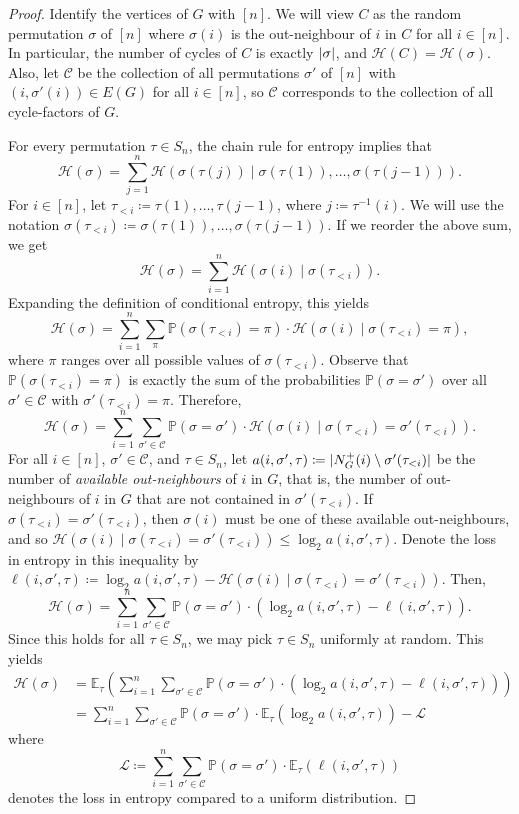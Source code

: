 \documentclass[10pt,a4paper]{amsart}
\newcommand{\pr}{\mathbb{P}}
\newcommand{\ev}{\mathbb{E}}
\newcommand{\ent}{\mathcal{H}}
\newcommand{\cL}{\mathcal L}
\newcommand{\C}{\mathcal C}
\newcommand{\logt}{\log_2}
\DeclarePairedDelimiter{\abs}{\lvert}{\rvert}
\begin{document}
\begin{proof}
    Identify the vertices of $G$ with $[n]$. We will view $C$ as the random permutation $\sigma$ of $[n]$ where $\sigma(i)$ is the out-neighbour of $i$ in $C$ for all $i \in [n]$. In particular, the number of cycles of $C$ is exactly $\abs{\sigma}$, and $\ent(C) = \ent(\sigma)$. Also, let $\C$ be the collection of all permutations $\sigma'$ of $[n]$ with $(i,\sigma'(i)) \in E(G)$ for all $i \in [n]$, so $\C$ corresponds to the collection of all cycle-factors of $G$.

    For every permutation $\tau \in S_n$, the chain rule for entropy implies that
    \[
        \ent(\sigma) = \sum_{j=1}^n \ent(\sigma(\tau(j)) \mid \sigma(\tau(1)), \dots, \sigma(\tau(j-1))).
    \]
    For $i \in [n]$, let $\tau_{<i} \coloneqq \tau(1), \dots, \tau(j-1)$, where $j \coloneqq \tau^{-1}(i)$. We will use the notation $\sigma(\tau_{<i}) \coloneqq \sigma(\tau(1)), \dots, \sigma(\tau(j-1))$. If we reorder the above sum, we get
    \[
        \ent(\sigma) = \sum_{i=1}^n \ent(\sigma(i) \mid \sigma(\tau_{<i})).
    \]
    Expanding the definition of conditional entropy, this yields
    \[
        \ent(\sigma) = \sum_{i=1}^n \sum_\pi \pr(\sigma(\tau_{<i}) = \pi) \cdot \ent(\sigma(i) \mid \sigma(\tau_{<i}) = \pi),
    \]
    where $\pi$ ranges over all possible values of $\sigma(\tau_{<i})$. Observe that $\pr(\sigma(\tau_{<i}) = \pi)$ is exactly the sum of the probabilities $\pr(\sigma = \sigma')$ over all $\sigma' \in \C$ with $\sigma'(\tau_{<i}) = \pi$. Therefore,
    \[
        \ent(\sigma) = \sum_{i=1}^n \sum_{\sigma' \in \C} \pr(\sigma = \sigma') \cdot \ent(\sigma(i) \mid \sigma(\tau_{<i}) = \sigma'(\tau_{<i})).
    \]
    For all $i \in [n]$, $\sigma' \in \C$, and $\tau \in S_n$, let $a(i,\sigma',\tau) \coloneqq \abs{N_G^+(i) \setminus \sigma'(\tau_{<i})}$ be the number of \emph{available out-neighbours} of $i$ in $G$, that is, the number of out-neighbours of $i$ in $G$ that are not contained in $\sigma'(\tau_{<i})$. If $\sigma(\tau_{<i}) = \sigma'(\tau_{<i})$, then $\sigma(i)$ must be one of these available out-neighbours, and so $\ent(\sigma(i) \mid \sigma(\tau_{<i}) = \sigma'(\tau_{<i})) \le \logt a(i,\sigma',\tau)$. Denote the loss in entropy in this inequality by $\ell(i,\sigma',\tau) \coloneqq \logt a(i,\sigma',\tau) - \ent(\sigma(i) \mid \sigma(\tau_{<i}) = \sigma'(\tau_{<i}))$. Then,
    \[
        \ent(\sigma) = \sum_{i=1}^n \sum_{\sigma' \in \C} \pr(\sigma = \sigma') \cdot (\logt a(i,\sigma',\tau) - \ell(i,\sigma',\tau)).
    \]
    Since this holds for all $\tau \in S_n$, we may pick $\tau \in S_n$ uniformly at random. This yields
    \begin{align*}
        \ent(\sigma) & = \ev_\tau\left(\sum_{i=1}^n \sum_{\sigma' \in \C} \pr(\sigma = \sigma') \cdot (\logt a(i,\sigma',\tau) - \ell(i,\sigma',\tau))\right) \\
        & = \sum_{i=1}^n \sum_{\sigma' \in \C} \pr(\sigma = \sigma') \cdot \ev_\tau(\logt a(i,\sigma',\tau)) - \cL
    \end{align*}
    where
    \[
        \cL \coloneqq \sum_{i=1}^n \sum_{\sigma' \in \C} \pr(\sigma = \sigma') \cdot \ev_\tau(\ell(i,\sigma',\tau))
    \]
    denotes the loss in entropy compared to a uniform distribution.
    

\end{proof}
\end{document}
